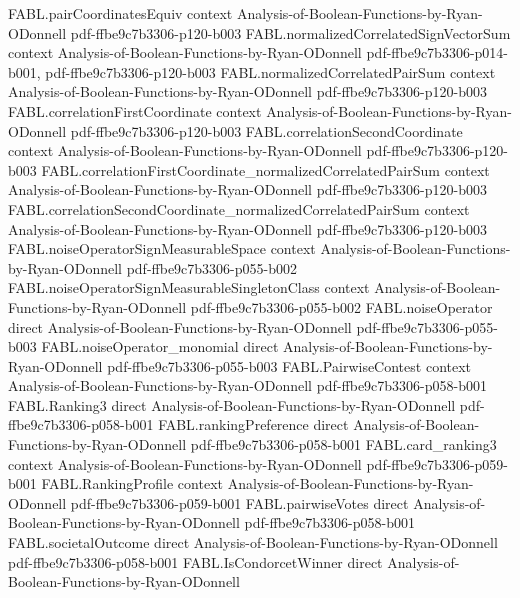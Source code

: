 \begin{theorem}
\proofstep
  {FABL.pairCoordinatesEquiv}
  {context}
  {Analysis-of-Boolean-Functions-by-Ryan-ODonnell}
  {pdf-ffbe9c7b3306-p120-b003}
\proofstep
  {FABL.normalizedCorrelatedSignVectorSum}
  {context}
  {Analysis-of-Boolean-Functions-by-Ryan-ODonnell}
  {pdf-ffbe9c7b3306-p014-b001,
    pdf-ffbe9c7b3306-p120-b003}
\proofstep
  {FABL.normalizedCorrelatedPairSum}
  {context}
  {Analysis-of-Boolean-Functions-by-Ryan-ODonnell}
  {pdf-ffbe9c7b3306-p120-b003}
\proofstep
  {FABL.correlationFirstCoordinate}
  {context}
  {Analysis-of-Boolean-Functions-by-Ryan-ODonnell}
  {pdf-ffbe9c7b3306-p120-b003}
\proofstep
  {FABL.correlationSecondCoordinate}
  {context}
  {Analysis-of-Boolean-Functions-by-Ryan-ODonnell}
  {pdf-ffbe9c7b3306-p120-b003}
\proofstep
  {FABL.correlationFirstCoordinate_normalizedCorrelatedPairSum}
  {context}
  {Analysis-of-Boolean-Functions-by-Ryan-ODonnell}
  {pdf-ffbe9c7b3306-p120-b003}
\proofstep
  {FABL.correlationSecondCoordinate_normalizedCorrelatedPairSum}
  {context}
  {Analysis-of-Boolean-Functions-by-Ryan-ODonnell}
  {pdf-ffbe9c7b3306-p120-b003}
\proofstep
  {FABL.noiseOperatorSignMeasurableSpace}
  {context}
  {Analysis-of-Boolean-Functions-by-Ryan-ODonnell}
  {pdf-ffbe9c7b3306-p055-b002}
\proofstep
  {FABL.noiseOperatorSignMeasurableSingletonClass}
  {context}
  {Analysis-of-Boolean-Functions-by-Ryan-ODonnell}
  {pdf-ffbe9c7b3306-p055-b002}
\proofstep
  {FABL.noiseOperator}
  {direct}
  {Analysis-of-Boolean-Functions-by-Ryan-ODonnell}
  {pdf-ffbe9c7b3306-p055-b003}
\proofstep
  {FABL.noiseOperator_monomial}
  {direct}
  {Analysis-of-Boolean-Functions-by-Ryan-ODonnell}
  {pdf-ffbe9c7b3306-p055-b003}
\proofstep
  {FABL.PairwiseContest}
  {context}
  {Analysis-of-Boolean-Functions-by-Ryan-ODonnell}
  {pdf-ffbe9c7b3306-p058-b001}
\proofstep
  {FABL.Ranking3}
  {direct}
  {Analysis-of-Boolean-Functions-by-Ryan-ODonnell}
  {pdf-ffbe9c7b3306-p058-b001}
\proofstep
  {FABL.rankingPreference}
  {direct}
  {Analysis-of-Boolean-Functions-by-Ryan-ODonnell}
  {pdf-ffbe9c7b3306-p058-b001}
\proofstep
  {FABL.card_ranking3}
  {context}
  {Analysis-of-Boolean-Functions-by-Ryan-ODonnell}
  {pdf-ffbe9c7b3306-p059-b001}
\proofstep
  {FABL.RankingProfile}
  {context}
  {Analysis-of-Boolean-Functions-by-Ryan-ODonnell}
  {pdf-ffbe9c7b3306-p059-b001}
\proofstep
  {FABL.pairwiseVotes}
  {direct}
  {Analysis-of-Boolean-Functions-by-Ryan-ODonnell}
  {pdf-ffbe9c7b3306-p058-b001}
\proofstep
  {FABL.societalOutcome}
  {direct}
  {Analysis-of-Boolean-Functions-by-Ryan-ODonnell}
  {pdf-ffbe9c7b3306-p058-b001}
\proofstep
  {FABL.IsCondorcetWinner}
  {direct}
  {Analysis-of-Boolean-Functions-by-Ryan-ODonnell}

\end{theorem}
